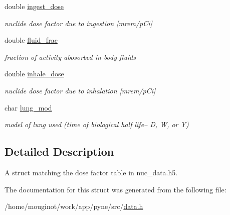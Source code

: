 \begin{DoxyCompactItemize}
\mbox{\label{structpyne_1_1dose_a96dc0ff17888672afb40c82b3c6bb996}} 
double \hyperlink{structpyne_1_1dose_a96dc0ff17888672afb40c82b3c6bb996}{ingest\+\_\+dose}
\begin{DoxyCompactList}\small\item\em nuclide dose factor due to ingestion \mbox{[}mrem/p\+Ci\mbox{]} \end{DoxyCompactList}\item 
\mbox{\label{structpyne_1_1dose_ac5aad706f373cee64e286f6191f753c2}} 
double \hyperlink{structpyne_1_1dose_ac5aad706f373cee64e286f6191f753c2}{fluid\+\_\+frac}
\begin{DoxyCompactList}\small\item\em fraction of activity abosorbed in body fluids \end{DoxyCompactList}\item 
\mbox{\label{structpyne_1_1dose_ade66b3422bf24883142e0de856d67228}} 
double \hyperlink{structpyne_1_1dose_ade66b3422bf24883142e0de856d67228}{inhale\+\_\+dose}
\begin{DoxyCompactList}\small\item\em nuclide dose factor due to inhalation \mbox{[}mrem/p\+Ci\mbox{]} \end{DoxyCompactList}\item 
\mbox{\label{structpyne_1_1dose_afc70c9461a6c1e3348a90e66747db41e}} 
char \hyperlink{structpyne_1_1dose_afc70c9461a6c1e3348a90e66747db41e}{lung\+\_\+mod}
\begin{DoxyCompactList}\small\item\em model of lung used (time of biological half life-- D, W, or Y) \end{DoxyCompactList}\end{DoxyCompactItemize}


\subsection{Detailed Description}
A struct matching the dose factor table in nuc\+\_\+data.\+h5. 

The documentation for this struct was generated from the following file\+:\begin{DoxyCompactItemize}
\item 
/home/mouginot/work/app/pyne/src/\hyperlink{data_8h}{data.\+h}\end{DoxyCompactItemize}
